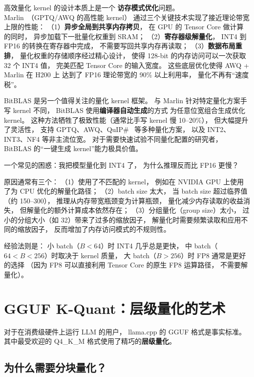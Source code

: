 高效量化 kernel 的设计本质上是一个
\textbf{访存模式优化}问题。
Marlin~\cite{frantar2024marlin}（GPTQ/AWQ 的高性能 kernel）
通过三个关键技术实现了接近理论带宽上限的性能：
（1）\textbf{异步全局到共享内存拷贝}，
在 GPU 的 Tensor Core 做计算的同时，
异步加载下一批量化权重到 SRAM；
（2）\textbf{寄存器级解量化}，
INT4 到 FP16 的转换在寄存器中完成，
不需要写回共享内存再读取；
（3）\textbf{数据布局重排}，
量化权重的存储顺序经过精心设计，
使得 128-bit 的内存访问可以一次获取 32 个 INT4 值，
完美匹配 Tensor Core 的输入宽度。
这些底层优化使得 AWQ + Marlin 在 H200 上
达到了 FP16 理论带宽的 90\% 以上利用率，
量化不再有“速度税”。

BitBLAS 是另一个值得关注的量化 kernel 框架。
与 Marlin 针对特定量化方案手写 kernel 不同，
BitBLAS 使用\textbf{编译器自动生成}的方式
为任意位宽组合生成优化 kernel。
这种方法牺牲了极致性能（通常比手写 kernel 慢 10--20\%），
但大幅提升了灵活性，
支持 GPTQ、AWQ、QuIP\#~\cite{chee2024quip} 等多种量化方案，
以及 INT2、INT3、NF4 等非主流位宽。
对于需要快速试验不同量化配置的研究者，
BitBLAS 的“一键生成 kernel”能力极具价值。

\begin{whybox}[为什么量化后的模型速度有时反而更慢？]
一个常见的困惑：我把模型量化到 INT4 了，
为什么推理反而比 FP16 更慢？

原因通常有三个：
（1）使用了不匹配的 kernel，
例如在 NVIDIA GPU 上使用了为 CPU 优化的解量化路径；
（2）batch size 太大，
当 batch size 超过临界值（约 150--300），
推理从内存带宽瓶颈变为计算瓶颈，
量化减少内存读取的收益消失，
但解量化的额外计算成本依然存在；
（3）分组量化（group size）太小，
过小的分组大小（如 32）带来了过多的缩放因子，
解量化时需要频繁读取和应用不同的缩放因子，
反而增加了内存访问模式的不规则性。

经验法则是：
小 batch（$B < 64$）时 INT4 几乎总是更快，
中 batch（$64 < B < 256$）时取决于 kernel 质量，
大 batch（$B > 256$）时 FP8 通常是更好的选择
（因为 FP8 可以直接利用 Tensor Core 的原生 FP8 运算路径，
不需要解量化）。
\end{whybox}


\section{GGUF K-Quant：层级量化的艺术}

对于在消费级硬件上运行 LLM 的用户，
llama.cpp 的 GGUF 格式是事实标准。
其中最受欢迎的 Q4\_K\_M 格式使用了精巧的\textbf{层级量化}。

\subsection{为什么需要分块量化？}

